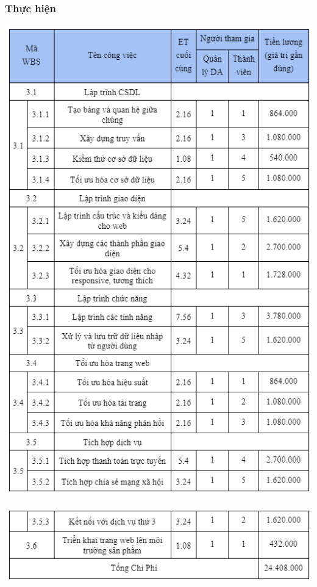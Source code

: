 \documentclass[12pt]{article}
\begin{document}
\subsubsection{Thực hiện}
\includegraphics[width=15cm]{ChiPhi5.png}
\par
\hspace{-0.5cm}\includegraphics[width=14.5cm]{ChiPhi6.png}
\vspace{0.5cm}
\end{document}
